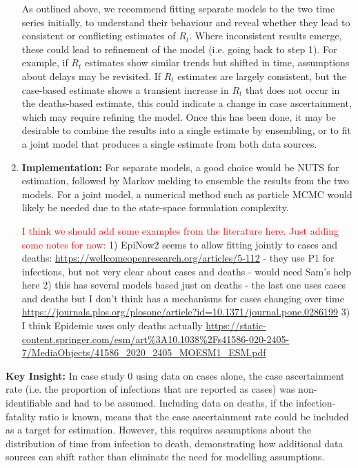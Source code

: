 \documentclass{article}
\begin{document}
\begin{enumerate}
       As outlined above, we recommend fitting separate models to the two time series initially, to understand their behaviour and reveal whether they lead to consistent or conflicting estimates of $R_t$. Where inconsistent results emerge, these could lead to refinement of the model (i.e. going back to step 1). For example, if $R_t$ estimates show similar trends but shifted in time, assumptions about delays may be revisited. If $R_t$ estimates are largely consistent, but the case-based estimate shows a transient increase in $R_t$ that does not occur in the deaths-based estimate, this could indicate a change in case ascertainment, which may require refining the model. Once this has been done, it may be desirable to combine the results into a single estimate by ensembling, or to fit a joint model that produces a single estimate from both data sources.  
       
    \item \textbf{Implementation:} For separate models, a good choice would be NUTS for estimation, followed by Markov melding to ensemble the results from the two models. For a joint model, a numerical method such as particle MCMC would likely be needed due to the state-space formulation complexity.

    \textcolor{red}{I think we should add some examples from the literature here. Just adding some notes for now:} 1) EpiNow2 seems to allow fitting jointly to cases and deaths: \url{https://wellcomeopenresearch.org/articles/5-112} - they use P1 for infections, but not very clear about cases and deaths - would need Sam's help here 2) this has several models based just on deaths - the last one uses cases and deaths but I don't think has a mechanisms for cases changing over time \url{https://journals.plos.org/plosone/article?id=10.1371/journal.pone.0286199} 3) I think Epidemic uses only deaths actually \url{https://static-content.springer.com/esm/art%3A10.1038%2Fs41586-020-2405-7/MediaObjects/41586_2020_2405_MOESM1_ESM.pdf}

    \end{enumerate}

\textbf{Key Insight:} In case study 0 using data on cases alone, the case ascertainment rate (i.e. the proportion of infections that are reported as cases) was non-identifiable and had to be assumed. Including data on deaths, if the infection-fatality ratio is known, means that the case ascertainment rate could be included as a target for estimation. However, this requires assumptions about the distribution of time from infection to death, demonstrating how additional data sources can shift rather than eliminate the need for modelling assumptions.
\end{document}
